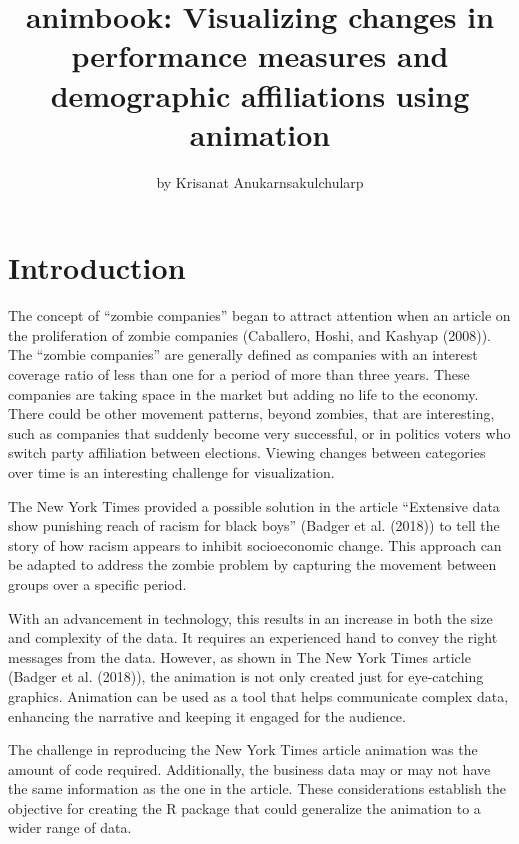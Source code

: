 \title{animbook: Visualizing changes in performance measures and demographic affiliations using animation}
\author{by Krisanat Anukarnsakulchularp}

\maketitle


\hypertarget{introduction}{%
\section{Introduction}\label{introduction}}

The concept of ``zombie companies'' began to attract attention when an article on the proliferation of zombie companies (Caballero, Hoshi, and Kashyap (2008)). The ``zombie companies'' are generally defined as companies with an interest coverage ratio of less than one for a period of more than three years. These companies are taking space in the market but adding no life to the economy. There could be other movement patterns, beyond zombies, that are interesting, such as companies that suddenly become very successful, or in politics voters who switch party affiliation between elections. Viewing changes between categories over time is an interesting challenge for visualization.

The New York Times provided a possible solution in the article ``Extensive data show punishing reach of racism for black boys'' (Badger et al. (2018)) to tell the story of how racism appears to inhibit socioeconomic change. This approach can be adapted to address the zombie problem by capturing the movement between groups over a specific period.

With an advancement in technology, this results in an increase in both the size and complexity of the data. It requires an experienced hand to convey the right messages from the data. However, as shown in The New York Times article (Badger et al. (2018)), the animation is not only created just for eye-catching graphics. Animation can be used as a tool that helps communicate complex data, enhancing the narrative and keeping it engaged for the audience.

The challenge in reproducing the New York Times article animation was the amount of code required. Additionally, the business data may or may not have the same information as the one in the article. These considerations establish the objective for creating the R package that could generalize the animation to a wider range of data.

